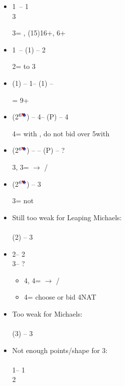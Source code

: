 \documentclass[12pt, a4paper]{article}
\begin{document}
\begin{itemize}

\item
1\clubs\ -- 1\hearts \\ 3\clubs 

3\clubs = \inv, (15)16+, 6+\clubs

\item
1\diams\ -- (1\spades) -- 2\spades 

2\spades = \ftwon to 3\diams 

\item
(1\hearts) -- 1\dbl -- (1\nt) -- \dbl 

\dbl = 9+

\item 
(2\diams$^\text{6\major}$) -- 4\clubs -- (P) -- 4\spades

4\spades = \pass with \spades, do not bid over 5\clubs with \hearts

\item
(2\diams$^\text{6\major}$) -- \dbl -- (P\alrts) -- ?

3\diams, 3\hearts = $\rightarrow$ \hearts/\spades

\item
(2\diams$^\text{6\major}$) -- 3\nt

3\nt = not \gf

\item Still too weak for Leaping Michaels: \\
\\
(2\spades) -- 3\spades

\item 2\clubs -- 2\hearts \\ 3\nt -- ?

\begin{itemize}
\item 4\diams, 4\hearts = $\rightarrow$ \hearts/\spades
\item 4\clubs = choose \major or bid 4\nt NAT
\end{itemize}

\item Too weak for Michaels: \\
\\
(3\hearts) -- 3\spades

\item Not enough points/shape for 3\spades:\\
 \\
1\clubs -- 1\spades \\
2\spades


\end{itemize}
\end{document}
